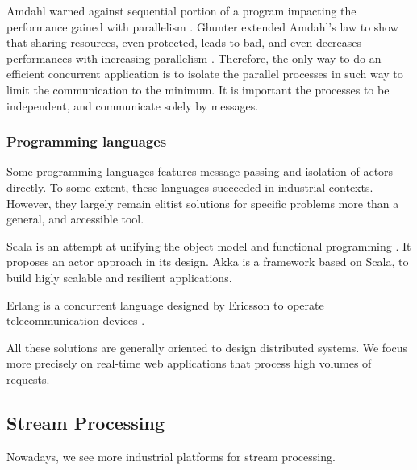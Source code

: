 Amdahl warned against sequential portion of a program impacting the performance gained with parallelism \cite{Amdahl1967}.
Ghunter extended Amdahl's law to show that sharing resources, even protected, leads to bad, and even decreases performances with increasing parallelism \cite{Gustafson1988,Gunther1993,Gunther1996,Nelson1996,Gunther2002}.
Therefore, the only way to do an efficient concurrent application is to isolate the parallel processes in such way to limit the communication to the minimum.
It is important the processes to be independent, and communicate solely by messages.

\subsubsection{Programming languages}


Some programming languages features message-passing and isolation of actors directly.
To some extent, these languages succeeded in industrial contexts.
However, they largely remain elitist solutions for specific problems more than a general, and accessible tool.

Scala is an attempt at unifying the object model and functional programming \cite{Odersky2004}.
It proposes an actor approach in its design.
Akka is a framework based on Scala, to build higly scalable and resilient applications.

Erlang is a concurrent language designed by Ericsson to operate telecommunication devices \cite{JoeArmstrong}.


All these solutions are generally oriented to design distributed systems.
We focus more precisely on real-time web applications that process high volumes of requests.



\subsection{Stream Processing} \label{chapter3:parallel-execution:stream-processing}

Nowadays, we see more industrial platforms for stream processing.










\endinput



